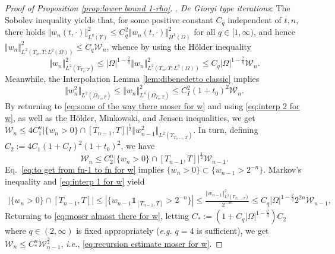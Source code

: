 \documentclass[11pt,a4paper,reqno]{amsart}
\theoremstyle{remark}
\theoremstyle{definition}
\numberwithin{equation}{section}
\begin{document}
\begin{proof}[Proof of Proposition \ref{prop:lower bound 1-rho}]
   \smallskip 

    . \textit{De Giorgi type iterations}: The Sobolev inequality yields that, for some positive constant $C_q$ independent of $t,n$, there holds $\Vert w_n(t,\cdot) \Vert_{L^q(\Upsilon)}^2 \leq C_q^2 \Vert w_n(t,\cdot) \Vert_{H^1(\Omega)}^2$ for all $q \in [1,\infty)$, and hence $ \Vert w_n \Vert_{L^2(T_n,T;L^q(\Omega))}^2 \leq C_q \mathscr{W}_n$, whence by using the H\"older inequality 
    \begin{equation}\label{eq:interp 1 for w}
        \Vert w_n \Vert^2_{L^2(\Upsilon_{T_n,T})} \leq |\Omega|^{1-\frac{2}{q}}\Vert w_n \Vert^2_{L^2(T_n,T;L^q(\Omega))} \leq  C_q  |\Omega|^{1-\frac{2}{q}} \mathscr{W}_n. 
    \end{equation}
Meanwhile, the Interpolation Lemma \ref{lem:dibenedetto classic} implies 
\begin{equation}\label{eq:interp 2 for w}
    \Vert w_n^2 \Vert_{L^{2}(\Omega_{T_n,T})} \leq \Vert w_n \Vert^2_{L^{4}(\Omega_{T_n,T})} \leq C_I^2(1+t_0)^2 \mathscr{W}_n. 
\end{equation}
By returning to \eqref{eq:some of the way there moser for w} and using \eqref{eq:interp 2 for w}, as well as the H\"older, Minkowski, and Jensen inequalities, we get $\mathscr{W}_n \leq 4 C_1^n |\{w_n>0\} \cap [T_{n-1},T]|^\frac{1}{2} \Vert w_{n-1}^2 \Vert_{L^{2}(\Upsilon_{T_{n-1},T})}$. In turn, defining $C_2 := 4C_1 (1+C_I)^2(1+t_0)^2$, we have 
\begin{equation}\label{eq:moser almost there for w}
    \mathscr{W}_n \leq C_2^n |\{w_n >0 \} \cap [T_{n-1},T]|^{\frac{1}{2}} \mathscr{W}_{n-1}. 
\end{equation}
Eq.~\eqref{eq:to get from fn-1 to fn for w} implies $\{w_n > 0\} \subset \{ w_{n-1} > 2^{-n}\}$. Markov's inequality and \eqref{eq:interp 1 for w} yield 
\begin{equation*}
   \begin{aligned}
       |\{w_n \!>\!0 \} \!\cap\! [T_{n-1},T]| \leq  |\{w_{n-1} \mathds{1}_{[T_{n-1},T]} \!>\! 2^{-n} \}| \!\leq\! \frac{\Vert w_{n-1}\Vert_{L^2(\Upsilon_{T_{n-1},T})}^2}{ 2^{-2n}} \!\leq\! C_q  |\Omega|^{1-\frac{2}{q}}  2^{2n}\mathscr{W}_{n-1}, 
   \end{aligned}
\end{equation*}
Returning to \eqref{eq:moser almost there for w}, letting $C_* := (1+C_q  |\Omega|^{1-\frac{2}{q}}) C_2$ where $q \in (2,\infty)$ is fixed appropriately (\textit{e.g.} $q=4$ is sufficient), we get $\mathscr{W}_n \leq C_*^n \mathscr{W}_{n-1}^{\frac{3}{2}}$, \textit{i.e.}, \eqref{eq:recursion estimate moser for w}. 


\end{proof}
\end{document}
